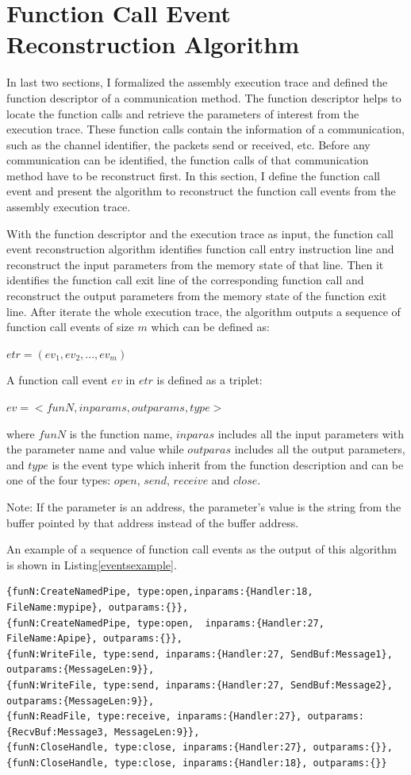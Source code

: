 \section{Function Call Event Reconstruction Algorithm}
In last two sections, I formalized the assembly execution trace and defined the function descriptor of a communication method. The function descriptor helps to locate the function calls and retrieve the parameters of interest from the execution trace. These function calls contain the information of a communication, such as the channel identifier, the packets send or received, etc. Before any communication can be identified, the function calls of that communication method have to be reconstruct first. In this section, I define the function call event and present the algorithm to reconstruct the function call events from the assembly execution trace. 

With the function descriptor and the execution trace as input, the function call event reconstruction algorithm identifies function call entry instruction line and reconstruct the input parameters from the memory state of that line. Then it identifies the function call exit line of the corresponding function call and reconstruct the output parameters from the memory state of the function exit line. After iterate the whole execution trace, the algorithm outputs a sequence of function call events of size $m$ which can be defined as:

$etr = (ev_1, ev_2, ..., ev_m)$

A function call event $ev$ in $etr$ is defined as a triplet:

$ev = <funN, inparams, outparams, type>$

where $funN$ is the function name, $inparas$ includes all the input parameters with the parameter name and value while $outparas$ includes all the output parameters, and $type$ is the event type which inherit from the function description and can be one of the four types: $open$, $send$, $receive$ and $close$.

Note: If the parameter is an address, the parameter's value is the string from the buffer pointed by that address instead of the buffer address.

An example of a sequence of function call events as the output of this algorithm is shown in Listing\ref{eventsexample}.

\begin{lstlisting}[caption= Example of  $etr$, label=eventsexample]
{funN:CreateNamedPipe, type:open,inparams:{Handler:18, FileName:mypipe}, outparams:{}},
{funN:CreateNamedPipe, type:open,  inparams:{Handler:27,  FileName:Apipe}, outparams:{}},
{funN:WriteFile, type:send, inparams:{Handler:27, SendBuf:Message1}, outparams:{MessageLen:9}},
{funN:WriteFile, type:send, inparams:{Handler:27, SendBuf:Message2}, outparams:{MessageLen:9}},
{funN:ReadFile, type:receive, inparams:{Handler:27}, outparams:{RecvBuf:Message3, MessageLen:9}},
{funN:CloseHandle, type:close, inparams:{Handler:27}, outparams:{}},
{funN:CloseHandle, type:close, inparams:{Handler:18}, outparams:{}}
\end{lstlisting}

